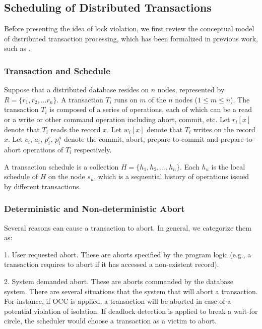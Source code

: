 \documentclass[conference]{IEEEtran}
\begin{document}
\subsection{Scheduling of Distributed Transactions}
Before presenting the idea of lock violation, we first review the conceptual model of distributed transaction processing,
which has been formalized in previous work, such as \cite{LockNoWait:journals/csur/BernsteinG81}.

\subsubsection{Transaction and Schedule}
Suppose that a distributed database resides on ${n}$ nodes, represented by ${R = \{r_1, r_2, ... r_n\}}$.
A transaction ${T_i}$ runs on ${m}$ of the ${n}$ nodes ($1 \le m \le n$).%
The transaction ${T_i}$ is composed of a series of operations,
each of which can be a read or a write or other command operation including abort, commit, etc.
Let ${r_i[x]}$ denote that ${T_i}$ reads the record ${x}$. Let ${w_i[x]}$ denote that ${T_i}$ writes on the record ${x}$.
Let ${c_i}$, ${a_i}$, ${p^c_i}$, ${p^a_i}$ denote the commit, abort, prepare-to-commit and prepare-to-abort operations of ${T_i}$ respectively.


A transaction schedule is a collection ${H = \{h_1, h_2, ..., h_n\}}$.
Each ${h_u}$ is the local schedule of $H$ on the node ${s_u}$, which is a sequential history of operations issued by different transactions.

\subsubsection{Deterministic and Non-deterministic Abort}

Several reasons can cause a transaction to abort. In general, we categorize them as:

1. User requested abort.
These are aborts specified by the program logic (e.g., a transaction requires to abort if it has accessed a non-existent record).

2. System demanded abort.
These are aborts commanded by the database system.
There are several situations that the system that will abort a transaction.
For instance, if OCC is applied, a transaction will be aborted in case of a potential violation of isolation.
If deadlock detection is applied to break a wait-for circle,
the scheduler would choose a transaction as a victim to abort.
\end{document}
